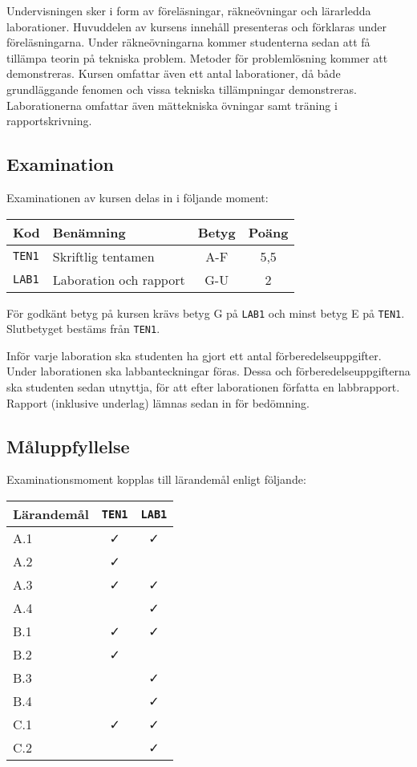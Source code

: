 Undervisningen sker i form av föreläsningar, räkneövningar och
lärarledda laborationer. Huvuddelen av kursens innehåll presenteras och
förklaras under föreläsningarna. Under räkneövningarna kommer
studenterna sedan att få tillämpa teorin på tekniska problem. Metoder
för problemlösning kommer att demonstreras. Kursen omfattar även ett
antal laborationer, då både grundläggande fenomen och vissa tekniska
tillämpningar demonstreras. Laborationerna omfattar även mättekniska
övningar samt träning i rapportskrivning.

\subsection*{Examination}

Examinationen av kursen delas in i följande moment:

\begin{longtable}[]{@{}llcc@{}}
\toprule
\textsf{Kod} & \textsf{Benämning} & \textsf{Betyg} & \textsf{Poäng}\tabularnewline
\midrule
\endhead
\texttt{TEN1} & Skriftlig tentamen & A-F & 5,5\tabularnewline
\texttt{LAB1} & Laboration och rapport & G-U & 2\tabularnewline
\bottomrule
\end{longtable}

För godkänt betyg på kursen krävs betyg G på \texttt{LAB1} och minst betyg E på
\texttt{TEN1}. Slutbetyget bestäms från \texttt{TEN1}.

Inför varje laboration ska studenten ha gjort ett antal
förberedelseuppgifter. Under laborationen ska labbanteckningar föras.
Dessa och förberedelseuppgifterna ska studenten sedan utnyttja, för att
efter laborationen författa en labbrapport. Rapport (inklusive underlag)
lämnas sedan in för bedömning.

\subsection*{Måluppfyllelse}

Examinationsmoment kopplas till lärandemål enligt följande:

\begin{longtable}[]{@{}lcc@{}}
\toprule
\textsf{Lärandemål} & \texttt{TEN1} & \texttt{LAB1}\tabularnewline
\midrule
\endhead
A.1 & \faCheck & \faCheck\tabularnewline
A.2 & \faCheck &\tabularnewline
A.3 & \faCheck & \faCheck\tabularnewline
A.4 & & \faCheck\tabularnewline
B.1 & \faCheck & \faCheck\tabularnewline
B.2 & \faCheck &\tabularnewline
B.3 & & \faCheck\tabularnewline
B.4 & & \faCheck\tabularnewline
C.1 & \faCheck & \faCheck\tabularnewline
C.2 & & \faCheck\tabularnewline
\bottomrule
\end{longtable}


